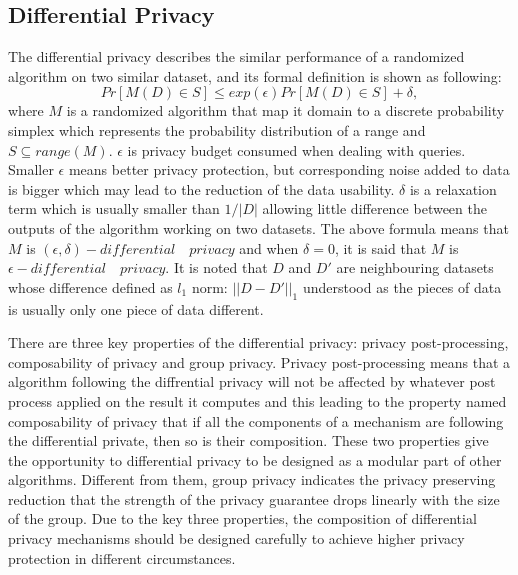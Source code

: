 \documentclass[conference]{IEEEtran}
\begin{document}
\subsection{Differential Privacy}
The differential privacy\cite{b2} describes the similar performance of a randomized algorithm on two similar dataset, and its formal definition is shown as following:
\begin{equation}
    Pr[M(D) \in S] \leq exp(\epsilon) Pr[M(D) \in S] + \delta,
\end{equation}
where $M$ is a randomized algorithm that map it domain to a discrete probability simplex which represents the probability distribution of a range and $S \subseteq range(M)$. $\epsilon$ is privacy budget consumed when dealing with queries. Smaller $\epsilon$ means better privacy protection, but corresponding noise added to data is bigger which may lead to the reduction of the data usability. $\delta$ is a relaxation term which is usually smaller than $1/|D|$ allowing little difference between the outputs of the algorithm working on two datasets. The above formula means that $M$ is $(\epsilon,\delta)-differential \quad privacy$ and when $\delta = 0$, it is said that $M$ is $\epsilon-differential \quad privacy$. It is noted that $D$ and $D'$ are neighbouring datasets whose difference defined as $l_1$ norm: $||D - D'||_1$ understood as the pieces of data is usually only one piece of data different.

There are three key properties of the differential privacy: privacy post-processing, composability of privacy and group privacy. \cite{b3} 
Privacy post-processing means that a algorithm following the diffrential privacy will not be affected by whatever post process applied on the result it computes and this leading to the property named composability of privacy that if all the components of a mechanism are following the differential private, then so is their composition. These two properties give the opportunity to differential privacy to be designed as a modular part of other algorithms. Different from them, group privacy indicates the privacy preserving reduction that the strength of the privacy guarantee drops linearly with the size of the group. Due to the key three properties, the composition of differential privacy mechanisms should be designed carefully to achieve higher privacy protection in different circumstances. 
\end{document}
